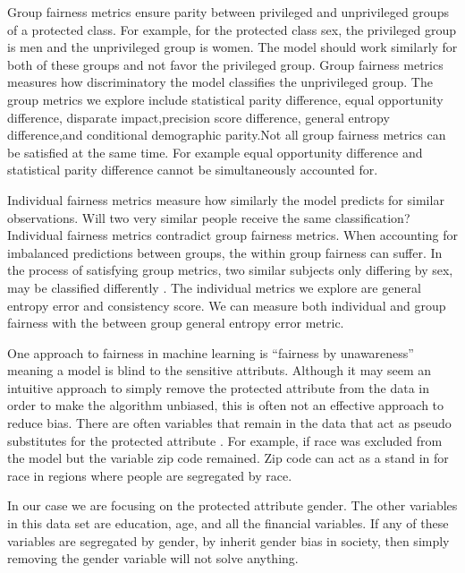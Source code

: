 \documentclass[water,article,submit,moreauthors,pdftex]{mdpi}
\begin{document}
Group fairness metrics ensure parity between privileged and unprivileged
groups of a protected class. For example, for the protected class sex,
the privileged group is men and the unprivileged group is women. The
model should work similarly for both of these groups and not favor the
privileged group. Group fairness metrics measures how discriminatory the
model classifies the unprivileged
group\citep{binns2020apparent, mehrabi2021survey, caton2020fairness}.
The group metrics we explore include statistical parity difference,
equal opportunity difference, disparate impact,precision score
difference, general entropy difference,and conditional demographic
parity.Not all group fairness metrics can be satisfied at the same time.
For example equal opportunity difference and statistical parity
difference cannot be simultaneously accounted
for\citep{kypraiou_what_2021}.

Individual fairness metrics measure how similarly the model predicts for
similar observations. Will two very similar people receive the same
classification? Individual fairness metrics contradict group fairness
metrics. When accounting for imbalanced predictions between groups, the
within group fairness can suffer\citep{kypraiou_what_2021}. In the
process of satisfying group metrics, two similar subjects only differing
by sex, may be classified differently
\citep{binns2020apparent, mehrabi2021survey, caton2020fairness, zhou2022bias}.
The individual metrics we explore are general entropy error and
consistency score. We can measure both individual and group fairness
with the between group general entropy error metric.

One approach to fairness in machine learning is ``fairness by
unawareness'' meaning a model is blind to the sensitive attributs.
Although it may seem an intuitive approach to simply remove the
protected attribute from the data in order to make the algorithm
unbiased, this is often not an effective approach to reduce bias. There
are often variables that remain in the data that act as pseudo
substitutes for the protected attribute \citep{zhou2022bias}. For
example, if race was excluded from the model but the variable zip code
remained. Zip code can act as a stand in for race in regions where
people are segregated by race.

In our case we are focusing on the protected attribute gender. The other
variables in this data set are education, age, and all the financial
variables. If any of these variables are segregated by gender, by
inherit gender bias in society, then simply removing the gender variable
will not solve anything.
\end{document}
